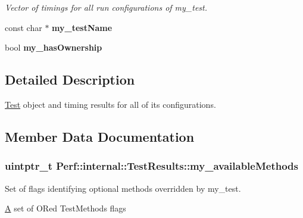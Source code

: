 \begin{DoxyCompactItemize}
\begin{DoxyCompactList}\small\item\em Vector of timings for all run configurations of my\+\_\+test. \end{DoxyCompactList}\item 
\hypertarget{structPerf_1_1internal_1_1TestResults_ad216a12c66cb7c6bd3da2c5b34462501}{}const char $\ast$ {\bfseries my\+\_\+test\+Name}\label{structPerf_1_1internal_1_1TestResults_ad216a12c66cb7c6bd3da2c5b34462501}

\item 
\hypertarget{structPerf_1_1internal_1_1TestResults_a0acfa2ce9e762f1c041c84cab4f986af}{}bool {\bfseries my\+\_\+has\+Ownership}\label{structPerf_1_1internal_1_1TestResults_a0acfa2ce9e762f1c041c84cab4f986af}

\end{DoxyCompactItemize}


\subsection{Detailed Description}
\hyperlink{classPerf_1_1Test}{Test} object and timing results for all of its configurations. 

\subsection{Member Data Documentation}
\hypertarget{structPerf_1_1internal_1_1TestResults_a8a6b70b4429aa994c86eb7a78b5ade9d}{}
\subsubsection[{my\+\_\+available\+Methods}]{\setlength{\rightskip}{0pt plus 5cm}uintptr\+\_\+t Perf\+::internal\+::\+Test\+Results\+::my\+\_\+available\+Methods}\label{structPerf_1_1internal_1_1TestResults_a8a6b70b4429aa994c86eb7a78b5ade9d}


Set of flags identifying optional methods overridden by my\+\_\+test. 

\hyperlink{structA}{A} set of O\+Red Test\+Methods flags \hypertarget{structPerf_1_1internal_1_1TestResults_a7d42b5547c38daedbdf14aa51ce3e2fc}{}
